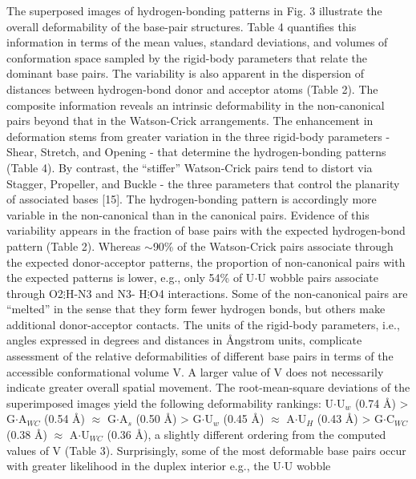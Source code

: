 The  superposed   images  of  hydrogen-bonding  patterns   in  Fig.  3
illustrate  the  overall deformability  of  the base-pair  structures.
Table  4 quantifies  this information  in  terms of  the mean  values,
standard deviations, and volumes  of conformation space sampled by the
rigid-body  parameters  that  relate  the dominant  base  pairs.   The
variability is  also apparent in  the dispersion of  distances between
hydrogen-bond  donor  and acceptor  atoms  (Table  2).  The  composite
information  reveals an intrinsic  deformability in  the non-canonical
pairs beyond  that in the Watson-Crick  arrangements.  The enhancement
in deformation  stems from greater  variation in the  three rigid-body
parameters  -  Shear,  Stretch,  and  Opening  -  that  determine  the
hydrogen-bonding  patterns  (Table 4).  By  contrast, the  ``stiffer''
Watson-Crick pairs tend to  distort via Stagger, Propeller, and Buckle
- the three parameters that  control the planarity of associated bases
[15]. The hydrogen-bonding pattern is accordingly more variable in the
non-canonical  than   in  the   canonical  pairs.  Evidence   of  this
variability appears  in the fraction  of base pairs with  the expected
hydrogen-bond   pattern   (Table  2).   Whereas   $\sim$90\%  of   the
Watson-Crick  pairs  associate  through  the  expected  donor-acceptor
patterns,  the proportion  of  non-canonical pairs  with the  expected
patterns is lower, e.g., only 54\% of U$\cdot$U wobble pairs associate
through O2$\vdots$H-N3  and N3- H$\vdots$O4 interactions.  Some of the
non-canonical pairs are  ``melted'' in the sense that  they form fewer
hydrogen   bonds,   but    others   make   additional   donor-acceptor
contacts.  The  units  of  the  rigid-body  parameters,  i.e.,  angles
expressed  in  degrees and  distances  in  Ångstrom units,  complicate
assessment of the relative  deformabilities of different base pairs in
terms of the  accessible conformational volume V. A  larger value of V
does not  necessarily indicate  greater overall spatial  movement. The
root-mean-square  deviations  of  the  superimposed images  yield  the
following  deformability   rankings:  U$\cdot$U$_{w}$  (0.74   \AA)  >
G$\cdot$A$_{WC}$  (0.54 \AA)  $\approx$ G$\cdot$A$_{s}$  (0.50  \AA) >
G$\cdot$U$_{w}$  (0.45  \AA) $\approx$  A$\cdot$U$_{H}$  (0.43 \AA)  >
G$\cdot$C$_{WC}$ (0.38  \AA) $\approx$ A$\cdot$U$_{WC}$  (0.36 \AA), a
slightly  different ordering  from  the computed  values  of V  (Table
3). Surprisingly,  some of the  most deformable base pairs  occur with
greater likelihood  in the duplex interior e.g.,  the U$\cdot$U wobble
